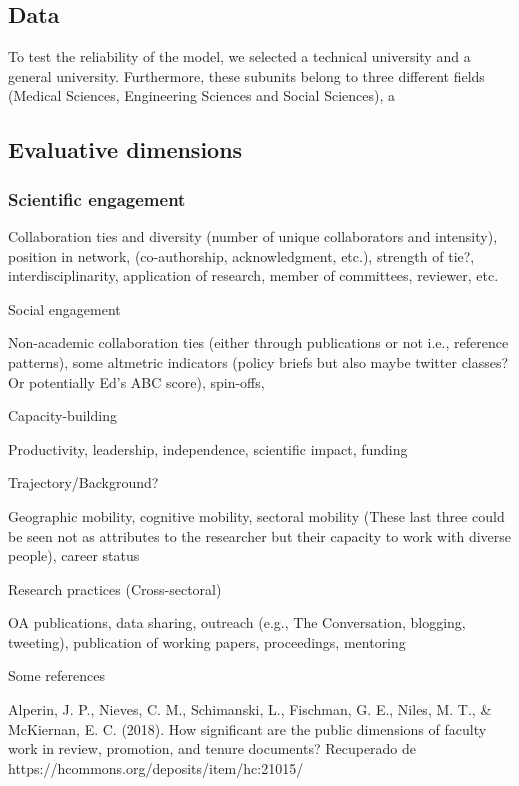 \documentclass[]{elsarticle} %
\begin{document}
\hypertarget{data}{%
\subsection{Data}\label{data}}

To test the reliability of the model, we selected a technical university
and a general university. Furthermore, these subunits belong to three
different fields (Medical Sciences, Engineering Sciences and Social
Sciences), a

\hypertarget{evaluative-dimensions}{%
\subsection{Evaluative dimensions}\label{evaluative-dimensions}}

\hypertarget{scientific-engagement}{%
\subsubsection{Scientific engagement}\label{scientific-engagement}}

Collaboration ties and diversity (number of unique collaborators and
intensity), position in network, (co-authorship, acknowledgment, etc.),
strength of tie?, interdisciplinarity, application of research, member
of committees, reviewer, etc.

Social engagement

Non-academic collaboration ties (either through publications or not
i.e., reference patterns), some altmetric indicators (policy briefs but
also maybe twitter classes? Or potentially Ed's ABC score), spin-offs,

Capacity-building

Productivity, leadership, independence, scientific impact, funding

Trajectory/Background?

Geographic mobility, cognitive mobility, sectoral mobility (These last
three could be seen not as attributes to the researcher but their
capacity to work with diverse people), career status

Research practices (Cross-sectoral)

OA publications, data sharing, outreach (e.g., The Conversation,
blogging, tweeting), publication of working papers, proceedings,
mentoring

Some references

Alperin, J. P., Nieves, C. M., Schimanski, L., Fischman, G. E., Niles,
M. T., \& McKiernan, E. C. (2018). How significant are the public
dimensions of faculty work in review, promotion, and tenure documents?
Recuperado de https://hcommons.org/deposits/item/hc:21015/
\end{document}
